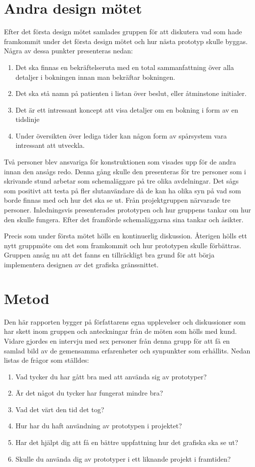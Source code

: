 \section{Andra design mötet}
Efter det första design mötet samlades gruppen för att diskutera vad som hade framkommit under det första design mötet och 
hur nästa prototyp skulle byggas. Några av dessa punkter presenteras nedan:
\begin{enumerate}
	\item Det ska finnas en bekräftelseruta med en total sammanfattning över alla detaljer i bokningen innan man 	 	
	bekräftar bokningen.
 	\item Det ska stå namn på patienten i listan över beslut, eller åtminstone initialer.
 	\item Det är ett intressant koncept att visa detaljer om en bokning i form av en tidslinje
 	\item Under översikten över lediga tider kan någon form av spårsystem vara intressant att utveckla.
\end{enumerate}
Två personer blev ansvariga för konstruktionen som visades upp för de andra innan den ansågs redo. Denna gång skulle den 
presenteras för tre personer som i skrivande stund arbetar som schemaläggare på tre olika avdelningar. Det sågs som 
positivt att testa på fler slutanvändare då de kan ha olika syn på vad som borde finnas med och hur det ska se ut. Från 
projektgruppen närvarade tre personer. Inledningsvis presenterades prototypen och hur gruppens tankar om hur den skulle 
fungera. Efter det framförde schemaläggarna sina tankar och åsikter. 

Precis som under första mötet hölls en kontinuerlig diskussion. Återigen hölls ett nytt gruppmöte om det som framkommit 
och hur prototypen skulle förbättras. Gruppen ansåg nu att det fanns en tillräckligt bra grund för att börja implementera 
designen av det grafiska gränssnittet.
  
\section{Metod}
Den här rapporten bygger på författarens egna upplevelser och diskussioner som har skett inom gruppen och anteckningar 
från de möten som hölls med kund. Vidare gjordes en intervju med sex personer från denna grupp för att få en samlad bild av de 
gemensamma erfarenheter och synpunkter som erhållits. Nedan listas de frågor som ställdes:
\begin{enumerate}
	\item Vad tycker du har gått bra med att använda sig av prototyper?
 	\item Är det något du tycker har fungerat mindre bra?
 	\item Vad det värt den tid det tog?
 	\item Hur har du haft användning av prototypen i projektet?
 	\item Har det hjälpt dig att få en bättre uppfattning hur det grafiska ska se ut?
 	\item Skulle du använda dig av prototyper i ett liknande projekt i framtiden? 
\end{enumerate}
 
